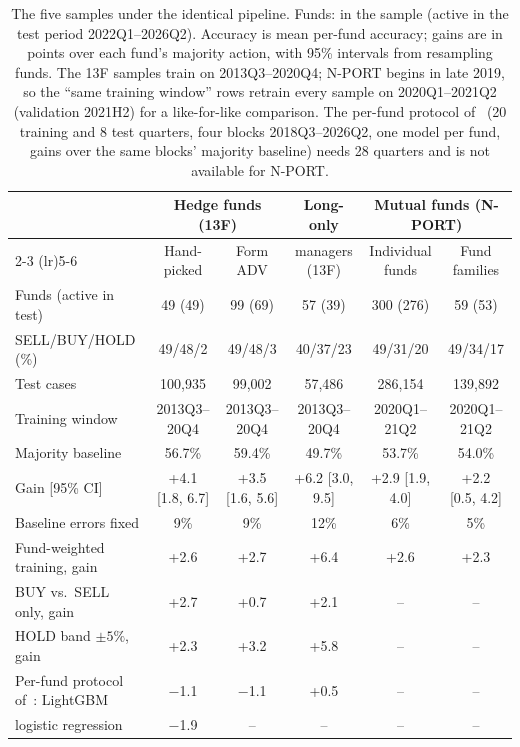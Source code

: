 \begin{table}[t]
  \caption{The five samples under the identical pipeline. Funds: in the sample (active in the test
  period 2022Q1--2026Q2). Accuracy is mean per-fund accuracy; gains are in points over each fund's
  majority action, with 95\% intervals from resampling funds. The 13F samples train on 2013Q3--2020Q4;
  N-PORT begins in late 2019, so the ``same training window'' rows retrain every sample on
  2020Q1--2021Q2 (validation 2021H2) for a like-for-like comparison. The per-fund protocol
  of~\cite{cohen2026mimicking} (20 training and 8 test quarters, four blocks 2018Q3--2026Q2, one model
  per fund, gains over the same blocks' majority baseline) needs 28 quarters and is not available for N-PORT.}
  \label{tab:samples}
  \small
  \setlength{\tabcolsep}{4pt}
  \begin{tabular}{@{}lccccc@{}}
    \toprule
     & \multicolumn{2}{c}{Hedge funds (13F)} & Long-only & \multicolumn{2}{c}{Mutual funds (N-PORT)} \\
    \cmidrule(lr){2-3} \cmidrule(lr){5-6}
     & Hand-picked & Form ADV & managers (13F) & Individual funds & Fund families \\
    \midrule
    Funds (active in test) & 49 (49) & 99 (69) & 57 (39) & 300 (276) & 59 (53) \\
    \quad SELL/BUY/HOLD (\%) & 49/48/2 & 49/48/3 & 40/37/23 & 49/31/20 & 49/34/17 \\
    Test cases & 100,935 & 99,002 & 57,486 & 286,154 & 139,892 \\
    Training window & 2013Q3--20Q4 & 2013Q3--20Q4 & 2013Q3--20Q4 & 2020Q1--21Q2 & 2020Q1--21Q2 \\
    \midrule
    Majority baseline & 56.7\% & 59.4\% & 49.7\% & 53.7\% & 54.0\% \\
    Gain [95\% CI] & +4.1 [1.8, 6.7] & +3.5 [1.6, 5.6] & +6.2 [3.0, 9.5] & +2.9 [1.9, 4.0] & +2.2 [0.5, 4.2] \\
    Baseline errors fixed & 9\% & 9\% & 12\% & 6\% & 5\% \\
    Fund-weighted training, gain & +2.6 & +2.7 & +6.4 & +2.6 & +2.3 \\
    BUY vs.\ SELL only, gain & +2.7 & +0.7 & +2.1 & -- & -- \\
    HOLD band $\pm5\%$, gain & +2.3 & +3.2 & +5.8 & -- & -- \\
    \midrule
    Per-fund protocol of~\cite{cohen2026mimicking}: LightGBM & \ensuremath{-}1.1 & \ensuremath{-}1.1 & +0.5 & -- & -- \\
    \quad logistic regression & \ensuremath{-}1.9 & -- & -- & -- & -- \\

\end{tabular}
\end{table}
